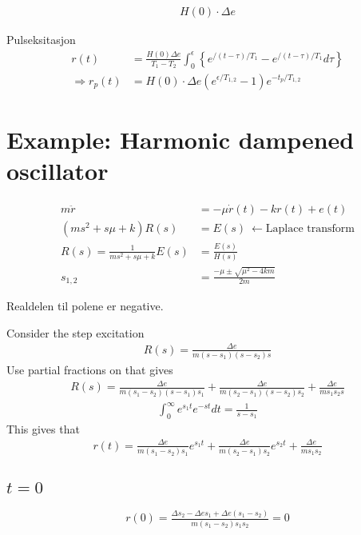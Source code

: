 \documentclass[norsk, 12pt]{article}
\title{}
\begin{document}
\begin{align*}
	H(0) \cdot \Delta e
\end{align*}

Pulseksitasjon
\begin{align*}
	r(t) &= \frac{H(0)\Delta e}{T_1-T_2}\int_{0}^{\epsilon}\left \{ e^{/(t-\tau)/T_1} - e^{/(t-\tau)/T_1} d\tau \right\}\\
	\Rightarrow r_p(t) &= H(0)\cdot \Delta e (e^{\epsilon/T_{1,2}}-1)e^{-t_p/T_{1,2}}
\end{align*}

\section{Example: Harmonic dampened oscillator}
\begin{align*}
	m\ddot{r} &= -\mu \dot{r}(t) - k r(t) + e(t)\\
	\left( ms^2 + s\mu + k \right) R(s) &= E(s) \:\leftarrow \text{Laplace transform}\\
	R(s) = \frac{1}{ms^2 + s\mu + k} E(s) &= \frac{E(s)}{H(s)}\\
	s_{1,2} &= \frac{-\mu \pm \sqrt{\mu^2 - 4km}}{2m}
\end{align*}

Realdelen til polene er negative.

Consider the step excitation 
\begin{align*}
	R(s) = \frac{\Delta e}{m(s-s_1)(s-s_2)s}
\end{align*}
Use partial fractions on that gives
\begin{align*}
	R(s) = \frac{\Delta e}{m(s_1-s_2)(s-s_1)s_1} + \frac{\Delta e}{m(s_2-s_1)(s-s_2)s_2}
	+ \frac{\Delta e}{ms_1 s_2 s}
\end{align*}
\begin{align*}
	\int_{0}^{\infty}e^{s_1 t} e^{-s t} dt = \frac{1}{s-s_1}
\end{align*}
This gives that
\begin{align*}
	r(t) = \frac{\Delta e}{m(s_1-s_2)s_1}e^{s_1 t} + \frac{\Delta e}{m(s_2-s_1)s_2} e^{s_2 t}
	+ \frac{\Delta e}{ms_1 s_2}
\end{align*}

\subsection{$t=0$}
\begin{align*}
	r(0) = \frac{\Delta s_2 - \Delta e s_1 + \Delta e (s_1-s_2)}{m(s_1-s_2)s_1 s_2} = 0
\end{align*}
\end{document}
